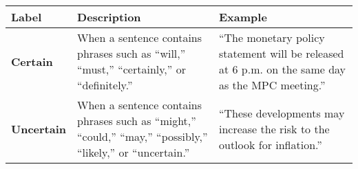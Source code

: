\begin{table*}
    \caption{}
    \vspace{1em}
    \begin{tabular}{p{}p{}p{}}
    \toprule
    \textbf{Label} & \textbf{Description} & \textbf{Example} \\
    \midrule
    \textbf{Certain} & When a sentence contains phrases such as “will,” “must,” “certainly,” or “definitely.”  & “The monetary policy statement will be released at 6 p.m. on the same day as the MPC meeting.” \\
    \midrule
    \textbf{Uncertain} & When a sentence contains phrases such as “might,” “could,” “may,” “possibly,” “likely,” or “uncertain.”  & “These developments may increase the risk to the outlook for inflation.” \\
    \bottomrule
    \end{tabular}
    \label{tb:bnm_certainty_guide}
\end{table*}
    